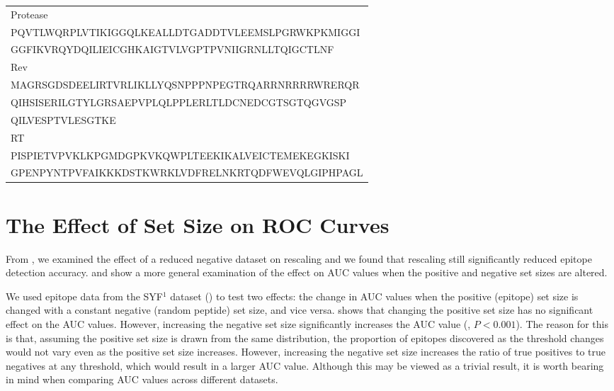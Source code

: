 \begin{table}[t]
\begin{center}
\begin{tabulary}{\textwidth}{|L|}
\hline
Protease \bigstrut[t] \\
PQVTLWQRPLVTIKIGGQLKEALLDTGADDTVLEEMSLPGRWKPKMIGGI \bigstrut[t] \\
GGFIKVRQYDQILIEICGHKAIGTVLVGPTPVNIIGRNLLTQIGCTLNF \bigstrut[b] \\
\hline
Rev \bigstrut[t] \\
MAGRSGDSDEELIRTVRLIKLLYQSNPPPNPEGTRQARRNRRRRWRERQR \bigstrut[t] \\
QIHSISERILGTYLGRSAEPVPLQLPPLERLTLDCNEDCGTSGTQGVGSP \\
QILVESPTVLESGTKE \bigstrut[b] \\
\hline
RT \bigstrut[t] \\
PISPIETVPVKLKPGMDGPKVKQWPLTEEKIKALVEICTEMEKEGKISKI \bigstrut[t] \\
GPENPYNTPVFAIKKKDSTKWRKLVDFRELNKRTQDFWEVQLGIPHPAGL \bigstrut[b] \\
\hline
\end{tabulary}
\end{center}
\end{table}


\section{The Effect of Set Size on ROC Curves}\label{AppendixA/sizeEffects}

From , we examined the effect of a reduced negative dataset on rescaling and we found that rescaling still significantly reduced epitope detection accuracy.  and  show a more general examination of the effect on AUC values when the positive and negative set sizes are altered.

We used epitope data from the SYF$^1$ dataset () to test two effects: the change in AUC values when the positive (epitope) set size is changed with a constant negative (random peptide) set size, and vice versa.  shows that changing the positive set size has no significant effect on the AUC values. However, increasing the negative set size significantly increases the AUC value (, $P < 0.001$). The reason for this is that, assuming the positive set size is drawn from the same distribution, the proportion of epitopes discovered as the threshold changes would not vary even as the positive set size increases. However, increasing the negative set size increases the ratio of true positives to true negatives at any threshold, which would result in a larger AUC value. Although this may be viewed as a trivial result, it is worth bearing in mind when comparing AUC values across different datasets. 


